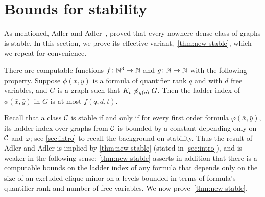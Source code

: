 
\section{Bounds for stability}\label{sec:stable}
As mentioned, Adler and Adler~\cite{adler2014interpreting}, 
proved that every nowhere dense class of graphs is stable. In this section,
we prove its effective variant,~\cref{thm:new-stable}, which 
we repeat for convenience.
\setcounter{theorem}{1}
\begin{theorem}
  There are computable functions $f\colon \N^3\to\N$ and $g\colon\N\to\N$ with the following property.
Suppose $\phi(\bar x,\bar y)$ is a formula of quantifier rank $q$ and with $d$ free variables,
and $G$ is a graph such that $K_t\not\minor_{g(q)} G$. Then the ladder index of $\phi(\bar x,\bar y)$ in $G$ is at most $f(q,d,t)$.
\end{theorem}



Recall that a class $\cal C$ is stable if and only if for every first order formula $\varphi(\bar x,\bar y)$, its ladder index over graphs from $\cal C$ is bounded by a constant depending only on $\cal C$ and $\varphi$;
see \cref{sec:intro} to recall the background on stability.
Thus the result of Adler and Adler is implied by \cref{thm:new-stable} (stated in \cref{sec:intro}), and is weaker in the following sense: \cref{thm:new-stable} asserts in addition that there is a computable bounds on the ladder index
of any formula that depends only on the size of an excluded clique minor on a levels bounded in terms of formula's quantifier rank and number of free variables. 
We now prove~\cref{thm:new-stable}.

